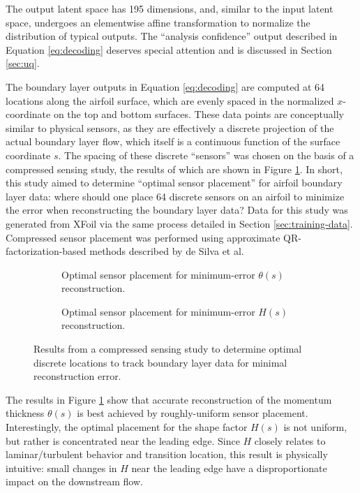 \documentclass[journal]{new-aiaa}
\begin{document}
The output latent space has 195 dimensions, and, similar to the input latent space, undergoes an elementwise affine transformation to normalize the distribution of typical outputs. The ``analysis confidence'' output described in Equation \ref{eq:decoding} deserves special attention and is discussed in Section \ref{sec:uq}.

The boundary layer outputs in Equation \ref{eq:decoding} are computed at 64 locations along the airfoil surface, which are evenly spaced in the normalized $x$-coordinate on the top and bottom surfaces. These data points are conceptually similar to physical sensors, as they are effectively a discrete projection of the actual boundary layer flow, which itself is a continuous function of the surface coordinate $s$. The spacing of these discrete ``sensors'' was chosen on the basis of a compressed sensing study, the results of which are shown in Figure \ref{fig:optimal_sensor_placement}. In short, this study aimed to determine ``optimal sensor placement'' for airfoil boundary layer data: where should one place 64 discrete sensors on an airfoil to minimize the error when reconstructing the boundary layer data? Data for this study was generated from XFoil via the same process detailed in Section \ref{sec:training-data}. Compressed sensor placement was performed using approximate QR-factorization-based methods described by de Silva et al. \cite{de_Silva2021}

\begin{figure}[H]
    \centering
    \begin{subfigure}[t]{0.49\textwidth}
        \centering
        
        \caption{Optimal sensor placement for minimum-error $\theta(s)$ reconstruction.}
    \end{subfigure}
    \begin{subfigure}[t]{0.49\textwidth}
        \centering
        
        \caption{Optimal sensor placement for minimum-error $H(s)$ reconstruction.}
    \end{subfigure}
    \caption{Results from a compressed sensing study to determine optimal discrete locations to track boundary layer data for minimal reconstruction error.}
    \label{fig:optimal_sensor_placement}
\end{figure}

The results in Figure \ref{fig:optimal_sensor_placement} show that accurate reconstruction of the momentum thickness $\theta(s)$ is best achieved by roughly-uniform sensor placement. Interestingly, the optimal placement for the shape factor $H(s)$ is not uniform, but rather is concentrated near the leading edge. Since $H$ closely relates to laminar/turbulent behavior and transition location, this result is physically intuitive: small changes in $H$ near the leading edge have a disproportionate impact on the downstream flow.
\end{document}
